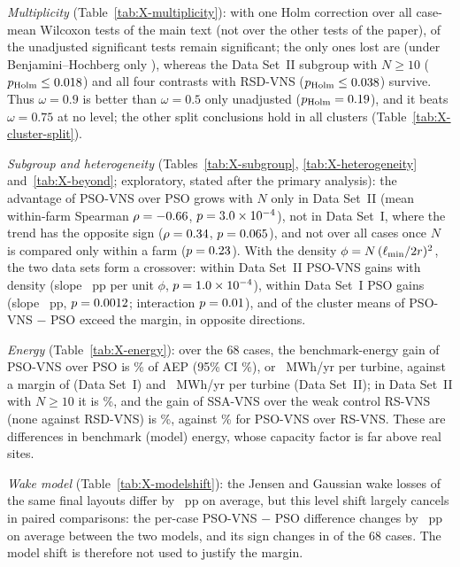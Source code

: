 \documentclass[10pt]{article}
\begin{document}
\emph{Multiplicity} (Table~\ref{tab:X-multiplicity}): with one Holm correction over all \NXMultN{} case-mean Wilcoxon tests of the main text (not over the other tests of the paper), \NXMultSigHolm{} of the \NXMultSigRaw{} unadjusted significant tests remain significant; the only ones lost are \NXMultLostHolm{} (under Benjamini--Hochberg only \NXMultLostBH), whereas the Data Set~II subgroup with $N\ge10$ ($p_{\rm Holm}\le0.018$) and all four contrasts with RSD-VNS ($p_{\rm Holm}\le0.038$) survive. Thus $\omega=0.9$ is better than $\omega=0.5$ only unadjusted ($p_{\rm Holm}=0.19$), and it beats $\omega=0.75$ at no level; the other split conclusions hold in all clusters (Table~\ref{tab:X-cluster-split}). %

\emph{Subgroup and heterogeneity} (Tables~\ref{tab:X-subgroup}, \ref{tab:X-heterogeneity} and~\ref{tab:X-beyond}; exploratory, stated after the primary analysis): the advantage of PSO-VNS over PSO grows with $N$ only in Data Set~II (mean within-farm Spearman $\rho=-0.66$, $p=3.0\times10^{-4}$), not in Data Set~I, where the trend has the opposite sign ($\rho=0.34$, $p=0.065$), and not over all cases once $N$ is compared only within a farm ($p=0.23$). %
 With the density $\phi=N\,(\ell_{\min}/2r)^2$, the two data sets form a crossover: within Data Set~II PSO-VNS gains with density (slope \NXDensSlopeDsII~pp per unit $\phi$, $p=1.0\times10^{-4}$), within Data Set~I PSO gains (slope \NXDensSlopeDsI~pp, $p=0.0012$; interaction $p=0.01$), and \NXHetClBeyond{} of the \NXClustersNum{} cluster means of PSO-VNS $-$ PSO exceed the margin, in opposite directions. %

\emph{Energy} (Table~\ref{tab:X-energy}): over the 68 cases, the benchmark-energy gain of PSO-VNS over PSO is \NXEnPSOVNSvsPSOPct\% of AEP (95\% CI \NXEnPSOVNSvsPSOPctCI\%), or \NXEnPSOVNSvsPSOMWhTurb~MWh/yr per turbine, against a margin of \NXMarginMWhTurbDsI{} (Data Set~I) and \NXMarginMWhTurbDsII~MWh/yr per turbine (Data Set~II); in Data Set~II with $N\ge10$ it is \NXEnPSOVNSvsPSOdsIILargePct\%, and the gain of SSA-VNS over the weak control RS-VNS (none against RSD-VNS) is \NXEnSSAVNSvsRSVNSPct\%, against \NXEnPSOVNSvsRSVNSPct\% for PSO-VNS over RS-VNS. These are differences in benchmark (model) energy, whose capacity factor is far above real sites. %

\emph{Wake model} (Table~\ref{tab:X-modelshift}): the Jensen and Gaussian wake losses of the same final layouts differ by \NXModelShiftMean~pp on average, but this level shift largely cancels in paired comparisons: the per-case PSO-VNS $-$ PSO difference changes by \NXModelShiftPairMean~pp on average between the two models, and its sign changes in \NXModelShiftPairSignChanges{} of the 68 cases. The model shift is therefore not used to justify the margin. %
\end{document}
